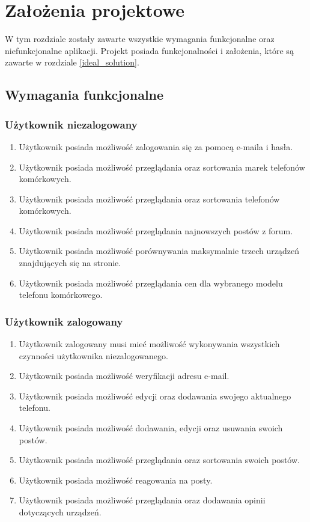 \section{Założenia projektowe}
W tym rozdziale zostały zawarte wszystkie wymagania funkcjonalne oraz niefunkcjonalne aplikacji. Projekt posiada funkcjonalności i założenia, które są zawarte w rozdziale \ref*{ideal_solution}. 
\subsection{Wymagania funkcjonalne}
\subsubsection{Użytkownik niezalogowany}
\begin{enumerate}
    \item Użytkownik posiada możliwość zalogowania się za pomocą e-maila i hasła.
    \item Użytkownik posiada możliwość przeglądania oraz sortowania marek telefonów komórkowych.
    \item Użytkownik posiada możliwość przeglądania oraz sortowania telefonów komórkowych.
    \item Użytkownik posiada możliwość przeglądania najnowszych postów z forum.
    \item Użytkownik posiada możliwość porównywania maksymalnie trzech urządzeń znajdujących się na stronie.
    \item Użytkownik posiada możliwość przeglądania cen dla wybranego modelu telefonu komórkowego.
\end{enumerate}
\subsubsection{Użytkownik zalogowany}
\begin{enumerate}
    \item Użytkownik zalogowany musi mieć możliwość wykonywania wszystkich czynności użytkownika niezalogowanego.
    \item Użytkownik posiada możliwość weryfikacji adresu e-mail.
    \item Użytkownik posiada możliwość edycji oraz dodawania swojego aktualnego telefonu.
    \item Użytkownik posiada możliwość dodawania, edycji oraz usuwania swoich postów.
    \item Użytkownik posiada możliwość przeglądania oraz sortowania swoich postów.
    \item Użytkownik posiada możliwość reagowania na posty.
    \item Użytkownik posiada możliwość przeglądania oraz dodawania opinii dotyczących urządzeń.
\end{enumerate}

